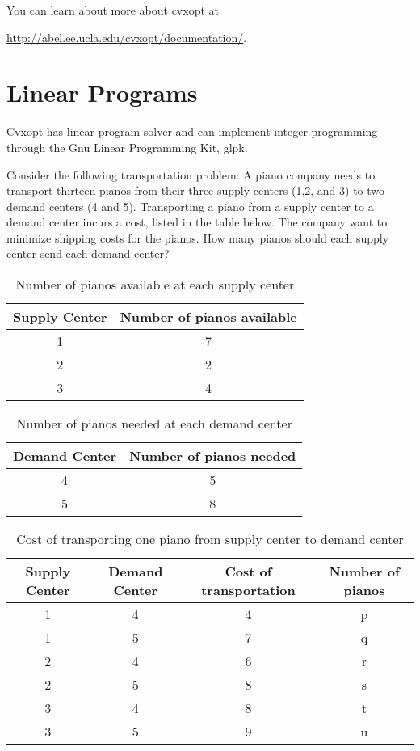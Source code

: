 \label{lab:Optimization 2}


You can learn about more about cvxopt at  

\url{http://abel.ee.ucla.edu/cvxopt/documentation/}.



\section*{Linear Programs}

Cvxopt has linear program solver and can implement integer programming through the Gnu Linear Programming Kit, glpk.




Consider the following transportation problem:
A piano company needs to transport thirteen pianos from their three  supply centers (1,2, and 3) to two demand centers (4 and 5). Transporting a piano from a supply center to a demand center incurs a cost, listed in the table below. The company want to minimize shipping costs for the pianos. How many pianos should each supply center send each demand center?


\begin{table}[h]
\centering
\begin{tabular}{|c|c|}
Supply Center & Number of pianos available\\
\hline
1 & 7\\
2 & 2\\
3 & 4\\
\end{tabular}

\caption{Number of pianos available at each supply center}
\end{table}

\begin{table}[h]
\centering
\begin{tabular}{|c|c|}
Demand Center & Number of pianos needed\\
\hline
4 & 5\\
5 & 8\\
\end{tabular}

\caption{Number of pianos needed at each demand center}
\end{table}


\begin{table}[h]
\centering
\begin{tabular}{|c|c|c|c|}
Supply Center & Demand Center & Cost of transportation & Number of pianos\\
\hline
1 & 4 & 4 & p\\
1 & 5 & 7 & q\\
2 & 4 & 6 & r\\
2 & 5 & 8 & s\\
3 & 4 & 8 & t\\
3 & 5 & 9 & u\\
\end{tabular}
\caption{Cost of transporting one piano from supply center to demand center}
\end{table}

